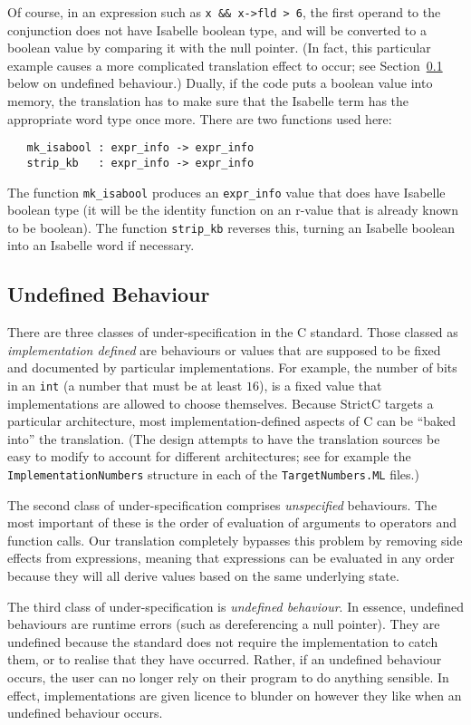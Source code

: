 \documentclass{article}
\newcommand{\strictc}{\textsf{StrictC}}
\newcommand{\MLsuffix}{.ML}
\newcommand{\srcfile}[1]{\texttt{#1}}
\newcommand{\MLfile}[1]{\srcfile{#1\MLsuffix}}
\begin{document}
Of course, in an expression such as \verb|x && x->fld > 6|, the first
operand to the conjunction does not have Isabelle boolean type, and
will be converted to a boolean value by comparing it with the null
pointer.  (In fact, this particular example causes a more complicated
translation effect to occur; see Section~\ref{sec:undefined-behaviour}
below on undefined behaviour.)  Dually, if the code puts a boolean
value into memory, the translation has to make sure that the Isabelle
term has the appropriate word type once more.  There are two functions
used here:
\begin{verbatim}
   mk_isabool : expr_info -> expr_info
   strip_kb   : expr_info -> expr_info
\end{verbatim}
The function \texttt{mk_isabool} produces an \texttt{expr_info} value
that does have Isabelle boolean type (it will be the identity function
on an r-value that is already known to be boolean).  The function
\texttt{strip_kb} reverses this, turning an Isabelle boolean into an
Isabelle word if necessary.

\subsection{Undefined Behaviour}
\label{sec:undefined-behaviour}

There are three classes of under-specification in the C standard.
Those classed as \emph{implementation defined} are behaviours or
values that are supposed to be fixed and documented by particular
implementations.  For example, the number of bits in an \texttt{int}
(a number that must be at least $16$), is a fixed value that implementations
are allowed to choose themselves.  Because \strictc{} targets a
particular architecture, most implementation-defined aspects of C can
be ``baked into'' the translation.  (The design attempts to have the
translation sources be easy to modify to account for different
architectures; see for example the \texttt{ImplementationNumbers}
structure in each of the \MLfile{TargetNumbers} files.)

The second class of under-specification comprises \emph{unspecified}
behaviours.  The most important of these is the order of evaluation of
arguments to operators and function calls.  Our translation completely
bypasses this problem by removing side effects from expressions,
meaning that expressions can be evaluated in any order because they
will all derive values based on the same underlying state.

The third class of under-specification is \emph{undefined behaviour}.
In essence, undefined behaviours are runtime errors (such as
dereferencing a null pointer).  They are undefined because the
standard does not require the implementation to catch them, or to
realise that they have occurred.  Rather, if an undefined behaviour
occurs, the user can no longer rely on their program to do anything
sensible.  In effect, implementations are given licence to blunder on
however they like when an undefined behaviour occurs.
\end{document}
